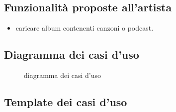 \documentclass{article}
\begin{document}
  \subsection{Funzionalità proposte all'artista}

  \begin{itemize}
    \item
    caricare album contenenti canzoni o podcast.
  \end{itemize}

  \subsection{Diagramma dei casi d'uso}
  \begin{figure}
    \centering
    
    \caption{diagramma dei casi d'uso}
    \label{fig:useCaseDiagram}
  \end{figure}

  \subsection{Template dei casi d'uso}
\end{document}
